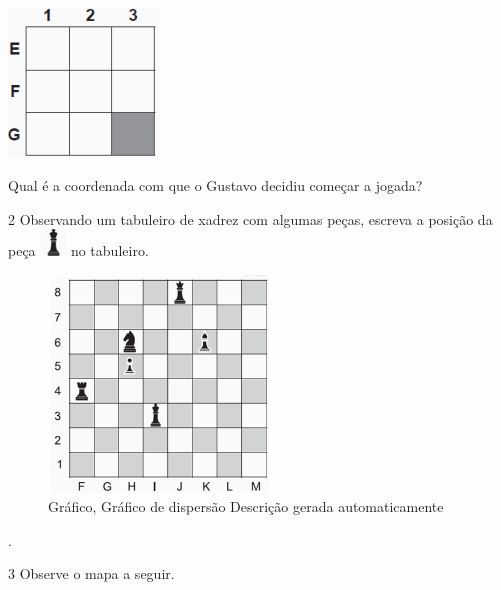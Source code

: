 \begin{escolha}
\begin{escolha}
\begin{escolha}
\begin{escolha}
{\begin{boxmedio}
\begin{boxpeq}
\begin{q°}
\begin{boxmedio}
\begin{boxpeq}
\begin{boxpeq}
\begin{boxmedio}
\begin{boxmedio}
\begin{boxmedio}
\includegraphics[width=1.5918in,height=1.55847in]{./_SAEB_9_MAT/media/image197.png}


Qual é a coordenada com que o Gustavo decidiu começar a jogada?


\num{2} Observando um tabuleiro de xadrez com algumas peças, escreva a posição
da peça
\includegraphics[width=0.27083in,height=0.27639in]{./_SAEB_9_MAT/media/image198.png}
no tabuleiro.

\begin{figure}
\centering
\includegraphics[width=2.40278in,height=2.27161in]{./_SAEB_9_MAT/media/image199.png}
\caption{Gráfico, Gráfico de dispersão Descrição gerada automaticamente}
\end{figure}


.

\num{3} Observe o mapa a seguir.


\end{boxmedio}
\end{boxmedio}
\end{boxmedio}
\end{boxpeq}
\end{boxpeq}
\end{boxmedio}
\end{q°}
\end{boxpeq}
\end{boxmedio}}
\end{escolha}
\end{escolha}
\end{escolha}
\end{escolha}
